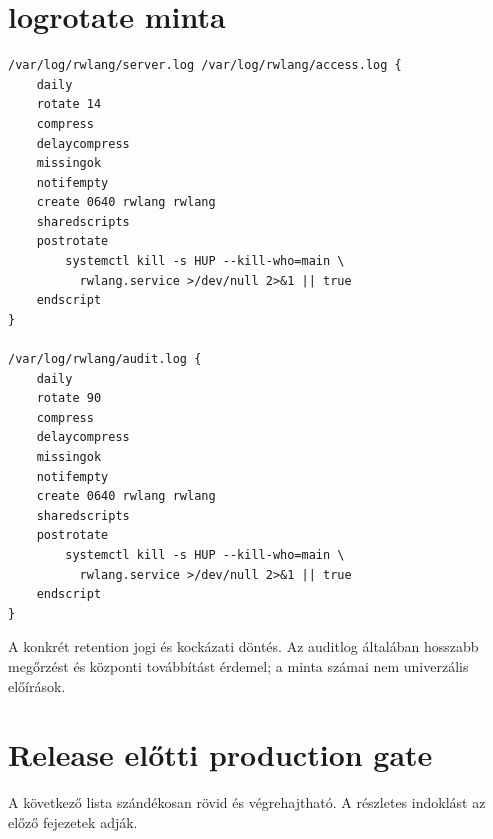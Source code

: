 \section{logrotate minta}

\begin{lstlisting}
/var/log/rwlang/server.log /var/log/rwlang/access.log {
    daily
    rotate 14
    compress
    delaycompress
    missingok
    notifempty
    create 0640 rwlang rwlang
    sharedscripts
    postrotate
        systemctl kill -s HUP --kill-who=main \
          rwlang.service >/dev/null 2>&1 || true
    endscript
}

/var/log/rwlang/audit.log {
    daily
    rotate 90
    compress
    delaycompress
    missingok
    notifempty
    create 0640 rwlang rwlang
    sharedscripts
    postrotate
        systemctl kill -s HUP --kill-who=main \
          rwlang.service >/dev/null 2>&1 || true
    endscript
}
\end{lstlisting}

A konkrét retention jogi és kockázati döntés. Az auditlog általában hosszabb megőrzést és központi továbbítást érdemel; a minta számai nem univerzális előírások.

\section{Release előtti production gate}

A következő lista szándékosan rövid és végrehajtható. A részletes indoklást az előző fejezetek adják.

